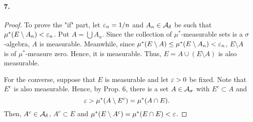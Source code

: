   \paragraph{7.}
  \begin{proof}
    To prove the "if" part, let $\varepsilon_n=1/n$ and $A_n\in\mathcal{A}_\delta$ be such
    that $\mu^*(E\setminus A_n)<\varepsilon_n$. Put $A=\bigcup A_n$. Since the 
    collection of $\mu^*$-measurable sets is a $\sigma$-algebra, $A$ is 
    measurable. Meanwhile, since $\mu^*(E\setminus A)\le\mu^*(E\setminus 
    A_n)<\varepsilon_n$, $E\setminus A$ is of $\mu^*$-measure zero. Hence, it is 
    measurable. Thus, $E=A\cup(E\setminus A)$ is also measurable.\par
    For the converse, suppose that $E$ is measurable and let $\varepsilon>0$ be fixed.
    Note that $E^c$ is also measurable. Hence, by Prop. 6, there is a set $A\in
    \mathcal{A}_\sigma$ with $E^c\subset A$ and
    \[
      \varepsilon>\mu^*(A\setminus E^c)=\mu^*(A\cap E).
    \]
    Then, $A^c\in\mathcal{A}_\delta$, $A^c\subset E$ and $\mu^*(E\setminus A^c)=
    \mu^*(E\cap E)<\varepsilon$.
  \end{proof}

